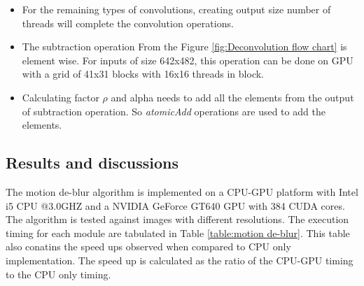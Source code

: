 \begin{itemize}
\begin{figure}[h!]
		\label{fig:convolution kernel}
	\end{figure}
	\item For the remaining types of convolutions, creating output size number of threads will complete the convolution operations.
	\item The subtraction operation From the Figure \ref{fig:Deconvolution flow chart} is element wise. For inputs of size 642x482, this operation can be done on GPU with a grid of 41x31 blocks with 16x16 threads in block.
	\item Calculating factor $\rho$ and alpha needs to add all the elements from the output of subtraction operation. So \textit{atomicAdd} operations are used to add the elements.
\end{itemize}

\subsection{Results and discussions}
The motion de-blur algorithm is implemented on a CPU-GPU platform with Intel i5 CPU @3.0GHZ and a NVIDIA GeForce GT640 GPU with 384 CUDA cores. The algorithm is tested against images with different resolutions. The execution timing for each module are tabulated in Table \ref{table:motion de-blur}. This table also conatins the speed ups observed when compared to CPU only implementation. The speed up is calculated as the ratio of the CPU-GPU timing to the CPU only timing.

